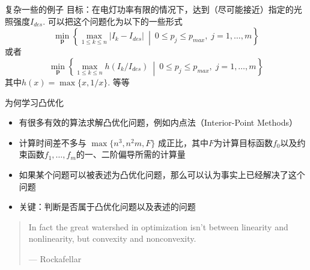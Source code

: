 
\begin{frame}

\begin{block}{复杂一些的例子}
目标：在电灯功率有限的情况下，达到（尽可能接近）指定的光照强度$I_{des}$. 可以把这个问题化为以下的一些形式
$$\min\limits_{\mathbf{p}} \left\{ \max\limits_{1\le k \le n} |I_k - I_{des}| \ \middle|\ 0 \le p_j \le p_{max}, \; j = 1,\ldots,m \right\}$$
或者
$$\min\limits_{\mathbf{p}} \left\{ \max\limits_{1\le k \le n} h(I_k / I_{des}) \ \middle|\ 0 \le p_j \le p_{max}, \; j = 1,\ldots,m \right\}$$
其中$h(x) = \max\{x,1/x\}$. 等等
\end{block}

\end{frame}


\begin{frame}

\begin{block}{为何学习凸优化}
\begin{itemize}
\item 有很多有效的算法求解凸优化问题，例如内点法（Interior-Point Methods）
\item 计算时间差不多与 $\max \{ n^3, n^2m, F \}$ 成正比，其中$F$为计算目标函数$f_0$以及约束函数$f_1,\ldots,f_m$的一、二阶偏导所需的计算量
\item 如果某个问题可以被表述为凸优化问题，那么可以认为事实上已经解决了这个问题
\item 关键：判断是否属于凸优化问题以及表述的问题
\end{itemize}

\vspace{1em}

\begin{quote}
\footnotesize
In fact the great watershed in optimization isn’t between linearity and nonlinearity, but convexity and nonconvexity.

\begin{flushright}
--- Rockafellar
\end{flushright}
\end{quote}
\end{block}

\end{frame}



